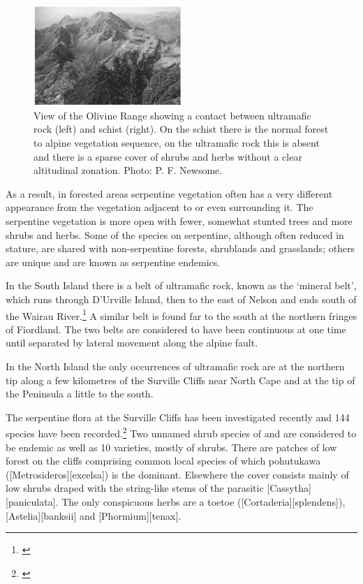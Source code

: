 \begin{figure}
	\includegraphics[width=0.5\textwidth]{graphics/figure89olivine-range.jpg}
	\centering
	\caption[View of the Olivine Range]{View of the Olivine Range showing a contact between ultramafic rock (left) and schist (right).
	On the schist there is the normal forest to alpine vegetation sequence, on the ultramafic rock this is absent and there is a sparse cover of shrubs and herbs without a clear altitudinal zonation.
	Photo: P. F. Newsome.}%
	\label{fig:89olivine-range}
\end{figure}

As a result, in forested areas serpentine vegetation often has a very different appearance from the vegetation adjacent to or even surrounding it.
The serpentine vegetation is more open with fewer, somewhat stunted trees and more shrubs and herbs.
Some of the species on serpentine, although often reduced in stature, are shared with non-serpentine forests, shrublands and grasslands; others are unique and are known as serpentine endemics.

In the South Island there is a belt of ultramafic rock, known as the `mineral belt', which runs through D'Urville Island, then to the east of Nelson and ends south of the Wairau River.\footnote{\cite{betts1918notes}}
A similar belt is found far to the south at the northern fringes of Fiordland.
The two belts are considered to have been continuous at one time until separated by lateral movement along the alpine fault.

In the North Island the only occurrences of ultramafic rock are at the northern tip along a few kilometres of the Surville Cliffs near North Cape and at the tip of the Peninsula a little to the south.

The serpentine flora at the Surville Cliffs has been investigated recently and 144 species have been recorded.\footnote{\cite{druce1979indigenous}}
Two unnamed shrub species of  and  are considered to be endemic as well as 10 varieties, mostly of shrubs.
There are patches of low forest on the cliffs comprising common local species of which pohutukawa ([Metrosideros][excelsa]) is the dominant.
Elsewhere the cover consists mainly of low shrubs draped with the string-like stems of the parasitic [Cassytha][paniculata].
The only conspicuous herbs are a toetoe ([Cortaderia][splendens]), [Astelia][banksii] and [Phormium][tenax].

